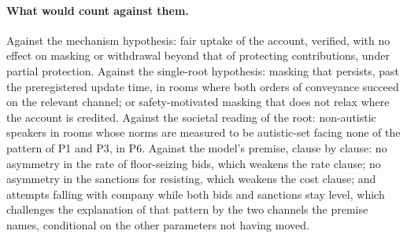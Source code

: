 \paragraph{What would count against them.} Against the mechanism hypothesis: fair uptake of the account, verified, with no effect on masking or withdrawal beyond that of protecting contributions, under partial protection. Against the single-root hypothesis: masking that persists, past the preregistered update time, in rooms where both orders of conveyance succeed on the relevant channel; or safety-motivated masking that does not relax where the account is credited. Against the societal reading of the root: non-autistic speakers in rooms whose norms are measured to be autistic-set facing none of the pattern of P1 and P3, in P6. Against the model's premise, clause by clause: no asymmetry in the rate of floor-seizing bids, which weakens the rate clause; no asymmetry in the sanctions for resisting, which weakens the cost clause; and attempts falling with company while both bids and sanctions stay level, which challenges the explanation of that pattern by the two channels the premise names, conditional on the other parameters not having moved.
